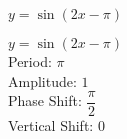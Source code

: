 {$y = \sin(2x - \pi)$}
{$y = \sin(2x - \pi)$\\
Period: $\pi$\\
Amplitude: $1$\\
Phase Shift: $\dfrac{\pi}{2}$\\
Vertical Shift: $0$

\begin{center}
\end{center}
}
